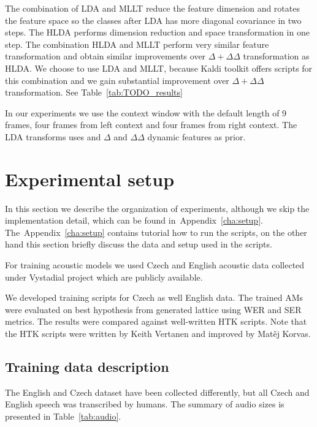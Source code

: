 The combination of \ac{LDA} and \ac{MLLT} reduce the feature dimension and
rotates the feature space so the classes after \ac{LDA} has more diagonal covariance in two steps.\cite{gopinath1998maximum}
The \ac{HLDA} performs dimension reduction and space transformation in one step.\cite{gales1999semi}
The combination \ac{HLDA} and \ac{MLLT} perform very similar feature transformation
and obtain similar improvements over $\Delta+\Delta\Delta$ transformation 
as \ac{HLDA}\cite{gales1999semi}\cite{gopinath1998maximum}.
We choose to use \ac{LDA} and \ac{MLLT}, because Kaldi toolkit offers scripts 
for this combination and we gain substantial improvement over $\Delta+\Delta\Delta$ transformation.
See Table~\ref{tab:TODO_results}

In our experiments we use the context window with the default length of 9 frames, 
four frames from left context and four frames from right context.
The \ac{LDA} transforms uses and $\Delta$ and $\Delta\Delta$ dynamic features as prior.



\section{Experimental setup} 
\label{sec:exps}
In this section we describe the organization of experiments,
although we skip the implementation detail, which can be found in~Appendix~\ref{cha:setup}.
The~Appendix~\ref{cha:setup} contains tutorial how to run the scripts, on the other hand
this section briefly discuss the data and setup used in the scripts. 

For training acoustic models we used Czech and English acoustic data
collected under Vystadial project which are publicly available.\cite{korvas_2014}

We developed training scripts for Czech as well English data.
The trained \acp{AM} were evaluated on best hypothesis from generated lattice using
\ac{WER} and \ac{SER} metrics.
The results were compared against well-written \ac{HTK} scripts.\cite{korvas_2014}
Note that the \ac{HTK} scripts were written by Keith Vertanen and improved by Matěj Korvas.

\subsection{Training data description}
\label{sub:training_data}

The English and Czech dataset have been collected differently,
but all Czech and English speech was transcribed by humans.
The summary of audio sizes is presented in Table~\ref{tab:audio}.

